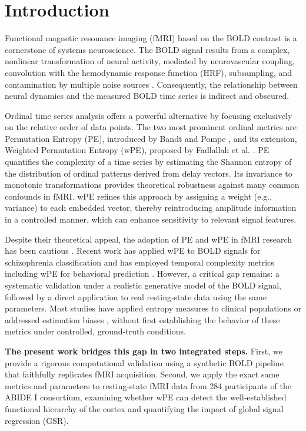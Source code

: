 \documentclass[12pt,a4paper]{article}
\begin{document}
	\section{Introduction}
	Functional magnetic resonance imaging (fMRI) based on the BOLD contrast is a cornerstone of systems neuroscience. The BOLD signal results from a complex, nonlinear transformation of neural activity, mediated by neurovascular coupling, convolution with the hemodynamic response function (HRF), subsampling, and contamination by multiple noise sources \cite{glover1999, logothetis2001}. Consequently, the relationship between neural dynamics and the measured BOLD time series is indirect and obscured.
	
	Ordinal time series analysis offers a powerful alternative by focusing exclusively on the relative order of data points. The two most prominent ordinal metrics are Permutation Entropy (PE), introduced by Bandt and Pompe \cite{bandt2002}, and its extension, Weighted Permutation Entropy (wPE), proposed by Fadlallah et al. \cite{fadlallah2013}. PE quantifies the complexity of a time series by estimating the Shannon entropy of the distribution of ordinal patterns derived from delay vectors. Its invariance to monotonic transformations provides theoretical robustness against many common confounds in fMRI. wPE refines this approach by assigning a weight (e.g., variance) to each embedded vector, thereby reintroducing amplitude information in a controlled manner, which can enhance sensitivity to relevant signal features.
	
	Despite their theoretical appeal, the adoption of PE and wPE in fMRI research has been cautious \cite{wang2014, nezafati2020, liu2024wpe}. Recent work has applied wPE to BOLD signals for schizophrenia classification \cite{liu2024wpe} and has employed temporal complexity metrics including wPE for behavioral prediction \cite{omidvarnia2024}. However, a critical gap remains: a systematic validation under a realistic generative model of the BOLD signal, followed by a direct application to real resting‑state data using the same parameters. Most studies have applied entropy measures to clinical populations \cite{bai2022, wang2017, xiang2021} or addressed estimation biases \cite{yang2018}, without first establishing the behavior of these metrics under controlled, ground‑truth conditions.
	
	\textbf{The present work bridges this gap in two integrated steps.} First, we provide a rigorous computational validation using a synthetic BOLD pipeline that faithfully replicates fMRI acquisition. Second, we apply the exact same metrics and parameters to resting‑state fMRI data from 284 participants of the ABIDE I consortium, examining whether wPE can detect the well‑established functional hierarchy of the cortex and quantifying the impact of global signal regression (GSR).
	
\end{document}
